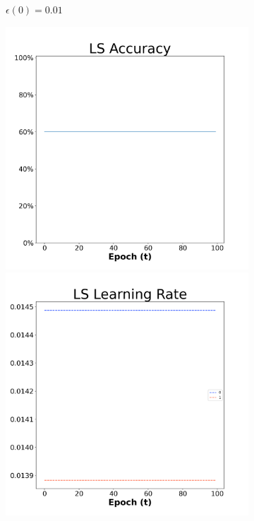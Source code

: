 \begin{figure}[H]
\begin{subfigure}{0.3\textwidth}
  \caption{$\epsilon(0)=0.01$}
\end{subfigure}\hfil %
\begin{subfigure}{0.3\textwidth}
  \includegraphics[width=\linewidth]{images/exper1/NSP/LS_0.03_acc.png}
  \includegraphics[width=\linewidth]{images/exper1/NSP/LS_0.03_lr.png}

\end{subfigure}
\end{figure}
